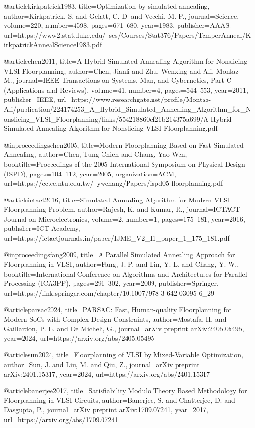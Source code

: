 @article{kirkpatrick1983,
  title={Optimization by simulated annealing},
  author={Kirkpatrick, S. and Gelatt, C. D. and Vecchi, M. P.},
  journal={Science},
  volume={220},
  number={4598},
  pages={671--680},
  year={1983},
  publisher={AAAS},
  url={https://www2.stat.duke.edu/~scs/Courses/Stat376/Papers/TemperAnneal/KirkpatrickAnnealScience1983.pdf}
}

@article{chen2011,
  title={A Hybrid Simulated Annealing Algorithm for Nonslicing VLSI Floorplanning},
  author={Chen, Jianli and Zhu, Wenxing and Ali, Montaz M.},
  journal={IEEE Transactions on Systems, Man, and Cybernetics, Part C (Applications and Reviews)},
  volume={41},
  number={4},
  pages={544--553},
  year={2011},
  publisher={IEEE},
  url={https://www.researchgate.net/profile/Montaz-Ali/publication/224174253_A_Hybrid_Simulated_Annealing_Algorithm_for_Nonslicing_VLSI_Floorplanning/links/554218860cf21b214375a699/A-Hybrid-Simulated-Annealing-Algorithm-for-Nonslicing-VLSI-Floorplanning.pdf}
}

@inproceedings{chen2005,
  title={Modern Floorplanning Based on Fast Simulated Annealing},
  author={Chen, Tung-Chieh and Chang, Yao-Wen},
  booktitle={Proceedings of the 2005 International Symposium on Physical Design (ISPD)},
  pages={104--112},
  year={2005},
  organization={ACM},
  url={https://cc.ee.ntu.edu.tw/~ywchang/Papers/ispd05-floorplanning.pdf}
}

@article{ictact2016,
  title={Simulated Annealing Algorithm for Modern VLSI Floorplanning Problem},
  author={Rajesh, K. and Kumar, R.},
  journal={ICTACT Journal on Microelectronics},
  volume={2},
  number={1},
  pages={175--181},
  year={2016},
  publisher={ICT Academy},
  url={https://ictactjournals.in/paper/IJME_V2_I1_paper_1_175_181.pdf}
}

@inproceedings{fang2009,
  title={A Parallel Simulated Annealing Approach for Floorplanning in VLSI},
  author={Fang, J. P. and Lin, Y. L. and Chang, Y. W.},
  booktitle={International Conference on Algorithms and Architectures for Parallel Processing (ICA3PP)},
  pages={291--302},
  year={2009},
  publisher={Springer},
  url={https://link.springer.com/chapter/10.1007/978-3-642-03095-6_29}
}

@article{parsac2024,
  title={PARSAC: Fast, Human-quality Floorplanning for Modern SoCs with Complex Design Constraints},
  author={Mostafa, H. and Gaillardon, P. E. and De Micheli, G.},
  journal={arXiv preprint arXiv:2405.05495},
  year={2024},
  url={https://arxiv.org/abs/2405.05495}
}

@article{sun2024,
  title={Floorplanning of VLSI by Mixed-Variable Optimization},
  author={Sun, J. and Liu, M. and Qiu, Z.},
  journal={arXiv preprint arXiv:2401.15317},
  year={2024},
  url={https://arxiv.org/abs/2401.15317}
}

@article{banerjee2017,
  title={Satisfiability Modulo Theory Based Methodology for Floorplanning in VLSI Circuits},
  author={Banerjee, S. and Chatterjee, D. and Dasgupta, P.},
  journal={arXiv preprint arXiv:1709.07241},
  year={2017},
  url={https://arxiv.org/abs/1709.07241}
}
